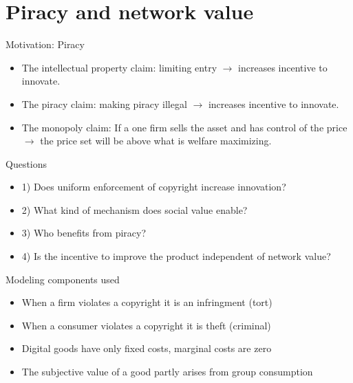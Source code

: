 \documentclass{beamer}
\numberwithin{equation}{section}
\begin{document}
\section{Piracy and network value}
\begin{frame}

\end{frame}
\begin{frame}{Motivation: Piracy}
\begin{itemize}
    \item The intellectual property claim: limiting entry $\rightarrow$ increases incentive to innovate.
    \item The piracy claim: making piracy illegal $\rightarrow$ increases incentive to innovate.
    \item The monopoly claim: If a one firm sells the asset and has control of the price $\rightarrow$ the price set will be above what is welfare maximizing. 
\end{itemize}
\end{frame}
\begin{frame}{Questions}
\begin{itemize}
    \item 1) Does uniform enforcement of copyright increase innovation?
    \item 2) What kind of mechanism does social value enable? 
    \item 3) Who benefits from piracy? 
    \item 4) Is the incentive to improve the product independent of network value? 
\end{itemize}
\end{frame}
\begin{frame}{Modeling components used}
\begin{itemize}
    \item When a firm violates a copyright it is an infringment (tort) 
    \item When a consumer violates a copyright it is theft (criminal)
    \item Digital goods have only fixed costs, marginal costs are zero
    \item The subjective value of a good partly arises from group consumption
\end{itemize}
\end{frame}
\end{document}
